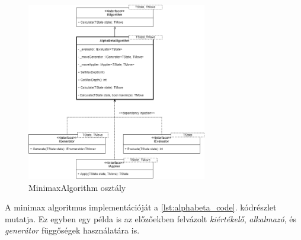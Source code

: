 \documentclass[twoside, a4paper, 12pt]{article}
\begin{document}
\begin{figure}[htbp]
	\centering
	\includegraphics[width=0.7\textwidth]{img/alphabetaAbstractDiagram.png}
	\caption{MinimaxAlgorithm osztály}
	\label{fig:alphaBetaAbstractDiagram}
\end{figure}

A minimax algoritmus implementációját a \ref{lst:alphabeta_code}. kódrészlet mutatja. Ez egyben egy példa is az előzőekben felvázolt \textit{kiértékelő}, \textit{alkalmazó}, és \textit{generátor} függőségek használatára is.
\end{document}
